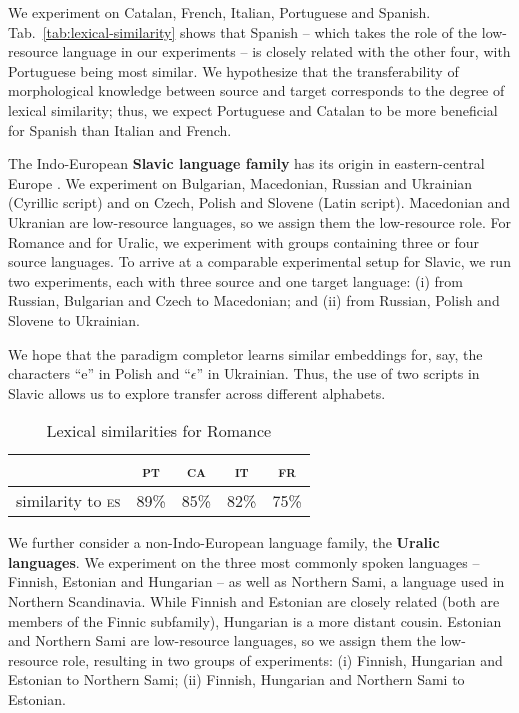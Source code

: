 \documentclass[11pt,letterpaper]{article}
\newcommand{\transfintabletxt}[1]{\textsc{#1}}
\def\tabref#1{Tab.~\ref{tab:#1}}
\def\tablabel#1{\label{tab:#1}\label{p:#1}}
\begin{document}
We experiment on Catalan, French, Italian,
Portuguese and Spanish. \tabref{lexical-similarity} shows that
Spanish -- which takes the role of the low-resource
language in our experiments -- is closely related with the other four, with
Portuguese being most similar. We
hypothesize that the transferability of morphological knowledge
between source and target  corresponds to
the degree of lexical similarity; thus, we expect Portuguese and Catalan to be more
beneficial for Spanish than Italian and French.


The Indo-European \textbf{Slavic language family} has its
origin in eastern-central Europe
\cite{corbett2003slavonic}. 
We experiment on Bulgarian,
Macedonian, Russian and Ukrainian (Cyrillic script)
and on
Czech,
Polish and Slovene (Latin script). 
Macedonian and Ukranian are 
low-resource languages, so we assign them the low-resource
role.
For Romance and for Uralic, we experiment with groups
containing three or four source languages. To arrive at
a comparable experimental setup for Slavic, we run two
experiments, each with three source and one target language:
(i) from Russian, Bulgarian and Czech to Macedonian; and 
(ii) from Russian, Polish and Slovene to
Ukrainian.

We hope that the paradigm
completor learns similar embeddings for, say, the characters
``e'' in Polish and ``$\epsilon$'' in Ukrainian.
Thus, the
use of two scripts in Slavic
allows us to explore transfer across
different alphabets. 


\begin{table}
  \centering
\small
\begin{tabular}{l|cccc}
&  \transfintabletxt{pt} & \transfintabletxt{ca} & \transfintabletxt{it} & \transfintabletxt{fr} \\\hline
similarity to \transfintabletxt{es}& 89\%& 85\%& 82\%& 75\%
\end{tabular}
\caption{Lexical similarities for Romance
 \cite{Lewis_book_2009}
\tablabel{lexical-similarity}}
\end{table}

We further consider a non-Indo-European language family, the \textbf{Uralic
languages}.  We experiment on the three most commonly spoken
languages -- Finnish, Estonian and Hungarian \cite{abondolo2015uralic} -- as well as 
Northern Sami, a language used in Northern Scandinavia. While Finnish and Estonian are closely related (both are members of the
Finnic subfamily), Hungarian is a more distant cousin.
Estonian and Northern Sami are 
low-resource languages, so we assign them the low-resource
role, resulting in two groups of experiments:
(i) Finnish, Hungarian and Estonian
to Northern Sami; 
(ii) Finnish, Hungarian and Northern Sami to Estonian.
\end{document}
